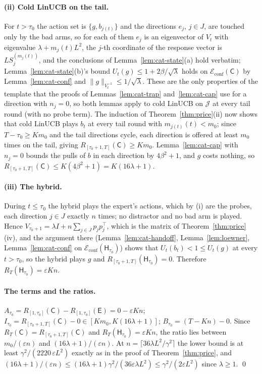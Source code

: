\documentclass{article}
\theoremstyle{definition}
\theoremstyle{remark}
\newcommand{\eps}{\varepsilon}
\theoremstyle{remark}
\newcommand{\Cold}{\mathsf{C}}
\newcommand{\Exp}{\mathsf{E}}
\newcommand{\Hyb}{\mathsf{H}}
\begin{document}
\paragraph{(ii) Cold LinUCB on the tail.}
For $t>\tau_0$ the action set is $\{g,b_{j(t)}\}$ and the directions $e_j$,
$j\in J$, are touched only by the bad arms, so for each of them $e_j$ is an
eigenvector of $V_t$ with eigenvalue $\lambda+m_j(t)L^2$, the $j$-th
coordinate of the response vector is $LS_j^{(m_j(t))}$, and the conclusions of
Lemma~\ref{lem:cat-state}(a) hold verbatim; Lemma~\ref{lem:cat-state}(b)'s
bound $U_t(g)\le1+2\beta/\sqrt\lambda$ holds on $\mathcal E_{\mathrm{conf}}(\Cold)$
by Lemma~\ref{lem:cat-conf} and $\|g\|_{V_t^{-1}}\le1/\sqrt\lambda$. These are
the only properties of the template that the proofs of
Lemmas~\ref{lem:cat-trap} and~\ref{lem:cat-cap} use for a direction with
$n_j=0$, so both lemmas apply to cold LinUCB on $\mathcal J$ at every tail
round (with no probe term). The induction of Theorem~\ref{thm:price}(ii) now
shows that cold LinUCB plays $b_t$ at every tail round with $m_{j(t)}(t)<m_0$;
since $T-\tau_0\ge Km_0$ and the tail directions cycle, each direction is
offered at least $m_0$ times on the tail, giving $R_{[\tau_0+1,T]}(\Cold)\ge Km_0$.
Lemma~\ref{lem:cat-cap} with $n_j=0$ bounds the pulls of $b$ in each
direction by $4\beta^2+1$, and $g$ costs nothing, so
$R_{[\tau_0+1,T]}(\Cold)\le K(4\beta^2+1)=K(16\lambda+1)$.

\paragraph{(iii) The hybrid.}
During $t\le\tau_0$ the hybrid plays the expert's actions, which by (i) are
the probes, each direction $j\in J$ exactly $n$ times; no distractor and no
bad arm is played. Hence $V_{\tau_0+1}=\lambda I+n\sum_{j\in J}p_jp_j^\top$,
which is the matrix of Theorem~\ref{thm:price}(iv), and the argument there
(Lemma~\ref{lem:cat-handoff}, Lemma~\ref{lem:loewner}, Lemma~\ref{lem:cat-conf}
on $\mathcal E_{\mathrm{conf}}(\Hyb_{\tau_0})$) shows that
$U_t(b_t)<1\le U_t(g)$ at every $t>\tau_0$, so the hybrid plays $g$ and
$R_{[\tau_0+1,T]}(\Hyb_{\tau_0})=0$. Therefore $R_T(\Hyb_{\tau_0})=\eps Kn$.

\paragraph{The terms and the ratios.}
$A_{\tau_0}=R_{[1,\tau_0]}(\Cold)-R_{[1,\tau_0]}(\Exp)=0-\eps Kn$;
$I_{\tau_0}=R_{[\tau_0+1,T]}(\Cold)-0\in[Km_0,K(16\lambda+1)]$;
$B_{\tau_0}=(T-Kn)-0$. Since $R_T(\Cold)=R_{[\tau_0+1,T]}(\Cold)$ and
$R_T(\Hyb_{\tau_0})=\eps Kn$, the ratio lies between $m_0/(\eps n)$ and
$(16\lambda+1)/(\eps n)$. At $n=\lceil36\lambda L^2/\gamma^2\rceil$ the lower bound
is at least $\gamma^2/(2220\,\eps L^2)$ exactly as in the proof of
Theorem~\ref{thm:price}, and $(16\lambda+1)/(\eps n)\le(16\lambda+1)\gamma^2/(36\eps\lambda L^2)\le \gamma^2/(2\eps L^2)$
since $\lambda\ge1$. \qed
\end{document}
